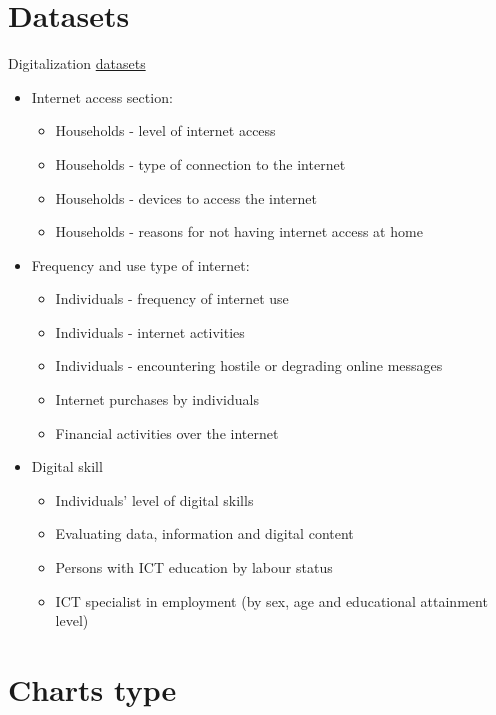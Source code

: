 \documentclass[12pt]{article}
\begin{document}
\section{Datasets}
Digitalization
\href{https://ec.europa.eu/eurostat/web/digital-economy-and-society/database}{datasets}
\begin{itemize}
    \item Internet access section:
          \begin{itemize}
              \item Households - level of internet access
              \item Households - type of connection to the internet
              \item Households - devices to access the internet
              \item Households - reasons for not having internet access at home
          \end{itemize}

    \item Frequency and use type of internet:
          \begin{itemize}
              \item Individuals - frequency of internet use
              \item Individuals - internet activities
              \item Individuals - encountering hostile or degrading online messages
              \item Internet purchases by individuals
              \item Financial activities over the internet
          \end{itemize}
    \item Digital skill
          \begin{itemize}
              \item Individuals' level of digital skills
              \item Evaluating data, information and digital content
              \item Persons with ICT education by labour status
              \item ICT specialist in employment (by sex, age and educational attainment level)
          \end{itemize}
\end{itemize}
\section{Charts type}
\end{document}
